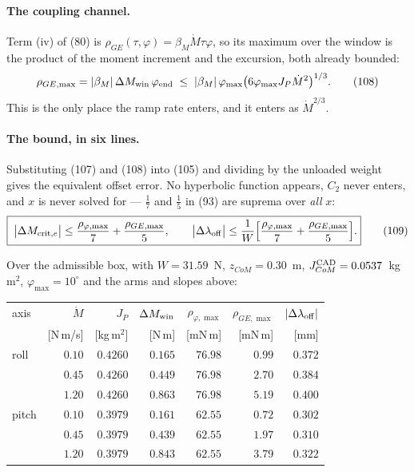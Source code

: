 \documentclass[10pt]{article}
\begin{document}
\paragraph{The coupling channel.}
Term (iv) of (80) is $\rho_{GE}(\tau,\varphi) = \beta_M\dot M\tau\varphi$,
so its maximum over the window is the product of the moment increment
and the excursion, both already bounded:
\begin{equation}
  \rho_{GE,\max}
  = |\beta_M|\,\Delta M_{\rm win}\,\varphi_{\rm end}
  \;\le\; |\beta_M|\,\varphi_{\max}
          \bigl(6\varphi_{\max}J_P\dot M^{2}\bigr)^{1/3} .
  \tag{108}
\end{equation}
This is the only place the ramp rate enters, and it enters as
$\dot M^{2/3}$.

\paragraph{The bound, in six lines.}
Substituting (107) and (108) into (105) and dividing by the unloaded
weight gives the equivalent offset error. No hyperbolic function
appears, $C_2$ never enters, and $x$ is never solved for --- $\tfrac17$
and $\tfrac15$ in (93) are suprema over \emph{all} $x$:
\begin{equation}
  \boxed{\;
  \bigl|\Delta M_{{\rm crit},e}\bigr|
  \le \frac{\rho_{\varphi,\max}}{7} + \frac{\rho_{GE,\max}}{5},
  \qquad
  \bigl|\Delta\lambda_{\rm off}\bigr|
  \le \frac{1}{W}\Bigl[\frac{\rho_{\varphi,\max}}{7}
                     + \frac{\rho_{GE,\max}}{5}\Bigr].}
  \tag{109}
\end{equation}

Over the admissible box, with $W = 31.59$~N, $z_{CoM} = 0.30$~m,
$J_{CoM}^{\rm CAD} = 0.0537$~kg\,m$^2$, $\varphi_{\max} = 10^\circ$ and
the arms and slopes above:

\begin{center}\small
\begin{tabular}{@{}lrrrrrr@{}}
\toprule
axis & $\dot M$ & $J_P$ & $\Delta M_{\rm win}$
 & $\rho_{\varphi,\max}$ & $\rho_{GE,\max}$
 & $|\Delta\lambda_{\rm off}|$ \\
 & [N\,m/s] & [kg\,m$^2$] & [N\,m] & [mN\,m] & [mN\,m] & [mm] \\
\midrule
roll  & $0.10$ & $0.4260$ & $0.165$ & $76.98$ & $0.99$ & $0.372$ \\
      & $0.45$ & $0.4260$ & $0.449$ & $76.98$ & $2.70$ & $0.384$ \\
      & $1.20$ & $0.4260$ & $0.863$ & $76.98$ & $5.19$ & $0.400$ \\
\midrule
pitch & $0.10$ & $0.3979$ & $0.161$ & $62.55$ & $0.72$ & $0.302$ \\
      & $0.45$ & $0.3979$ & $0.439$ & $62.55$ & $1.97$ & $0.310$ \\
      & $1.20$ & $0.3979$ & $0.843$ & $62.55$ & $3.79$ & $0.322$ \\
\bottomrule
\end{tabular}
\end{center}
\end{document}
